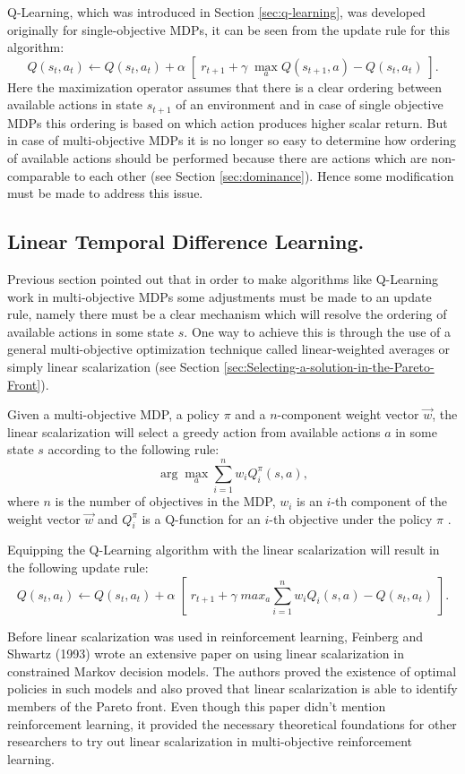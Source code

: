 Q-Learning, which was introduced in Section \ref{sec:q-learning}, was developed originally for single-objective MDPs, it can be seen from the update rule for this algorithm:
$$ Q(s_{t},a_{t}) \leftarrow Q(s_{t},a_{t}) + \alpha \; \left[\;r_{t+1} + \gamma\; \max_{a}Q(s_{t+1},a) - Q(s_{t},a_{t})\;\right]. $$
Here the maximization operator assumes that there is a clear ordering between available actions in state $s_{t+1}$ of an environment and in case of single objective MDPs this ordering is based on which action produces higher scalar return. But in case of multi-objective MDPs it is no longer so easy to determine how ordering of available actions should be performed because there are actions which are non-comparable to each other (see Section \ref{sec:dominance}). Hence some modification must be made to address this issue.

\subsection{Linear Temporal Difference Learning.}
Previous section pointed out that in order to make algorithms like Q-Learning work in multi-objective MDPs some adjustments must be made to an update rule, namely there must be a clear mechanism which will resolve the ordering of available actions in some state $s$. One way to achieve this is through the use of a general multi-objective optimization technique called linear-weighted averages or simply linear scalarization (see Section \ref{sec:Selecting-a-solution-in-the-Pareto-Front}).

Given a multi-objective MDP, a policy $\pi$ and a $n$-component weight vector $\vec{w}$, the linear scalarization will select a greedy action from available actions $a$ in some state $s$ according to the following rule:
$$ \arg\max_{a}\displaystyle\sum_{i=1}^{n} w_{i}Q^{\pi}_{i}(s,a), $$
where $n$ is the number of objectives in the MDP, $w_{i}$ is an $i$-th component of the weight vector $\vec{w}$ and $Q^{\pi}_{i}$ is a Q-function for an $i$-th objective under the policy $\pi$ .

Equipping the Q-Learning algorithm with the linear scalarization will result in the following update rule:
$$ Q(s_{t},a_{t}) \leftarrow Q(s_{t},a_{t}) + \alpha \; \left[\;r_{t+1} + \gamma\; max_{a}\displaystyle\sum_{i=1}^{n} w_{i}Q_{i}(s,a) - Q(s_{t},a_{t})\;\right]. $$

Before linear scalarization was used in reinforcement learning, Feinberg and Shwartz (1993)\nocite{Feinberg93constrainedmarkov} wrote an extensive paper on using linear scalarization in constrained Markov decision models. The authors proved the existence of optimal policies in such models and also proved that linear scalarization is able to identify members of the Pareto front. Even though this paper didn't mention reinforcement learning, it provided the necessary theoretical foundations for other researchers to try out linear scalarization in multi-objective reinforcement learning.

